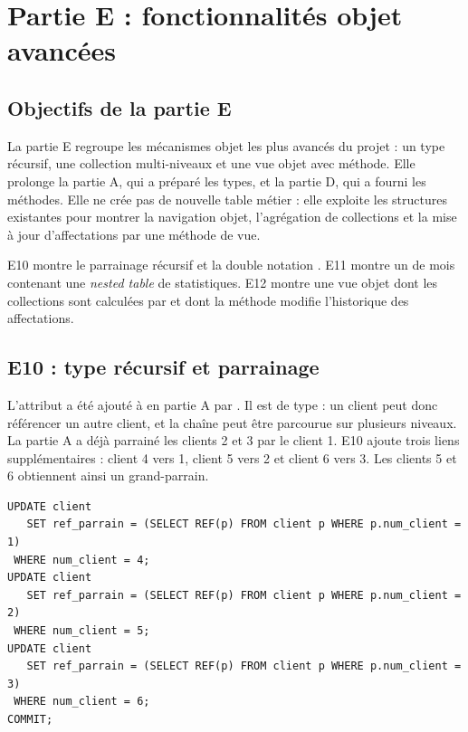 \chapter{Partie E : fonctionnalités objet avancées}
\label{chap:partieE}

\section{Objectifs de la partie E}

La partie E regroupe les mécanismes objet les plus avancés du projet : un type
récursif, une collection multi-niveaux et une vue objet avec méthode. Elle
prolonge la partie A, qui a préparé les types, et la partie D, qui a fourni les
méthodes. Elle ne crée pas de nouvelle table métier : elle exploite les
structures existantes pour montrer la navigation objet, l'agrégation de
collections et la mise à jour d'affectations par une méthode de vue.

\begin{objectifbox}
E10 montre le parrainage récursif et la double notation
. E11 montre un  de mois
contenant une \emph{nested table} de statistiques. E12 montre une vue objet
dont les collections sont calculées par  et dont la
méthode  modifie l'historique des affectations.
\end{objectifbox}

\section{E10 : type récursif et parrainage}

L'attribut  a été ajouté à  en partie A
par . Il est de type
 : un client peut donc référencer un autre client, et la
chaîne peut être parcourue sur plusieurs niveaux. La partie A a déjà parrainé
les clients 2 et 3 par le client 1. E10 ajoute trois liens supplémentaires :
client 4 vers 1, client 5 vers 2 et client 6 vers 3. Les clients 5 et 6
obtiennent ainsi un grand-parrain.

\begin{lstlisting}[caption={E10 : mise à jour des liens de parrainage.},label={lst:e10}]
UPDATE client
   SET ref_parrain = (SELECT REF(p) FROM client p WHERE p.num_client = 1)
 WHERE num_client = 4;
UPDATE client
   SET ref_parrain = (SELECT REF(p) FROM client p WHERE p.num_client = 2)
 WHERE num_client = 5;
UPDATE client
   SET ref_parrain = (SELECT REF(p) FROM client p WHERE p.num_client = 3)
 WHERE num_client = 6;
COMMIT;
\end{lstlisting}


